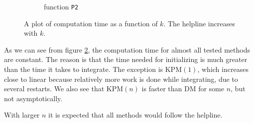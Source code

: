 \begin{figure}[H]
\begin{subfigure}[b]{0.45\textwidth}
                \caption{function \texttt{P2}}
                \label{fig:timek2}
        \end{subfigure}
        \caption{A plot of computation time as a function of $k$. The helpline increases with $k$.}\label{fig:timek}
\end{figure}
As we can see from figure \ref{fig:timek}, the computation time for almost all tested methods are constant. The reason is that the time needed for initializing is much greater than the time it takes to integrate. 
The exception is KPM$(1)$, which increases close to linear because relatively more work is done while integrating, due to several restarts. 
We also see that KPM$(n)$ is faster than DM for some $n$, but not asymptotically.

With larger $n$ it is expected that all methods would follow the helpline.
